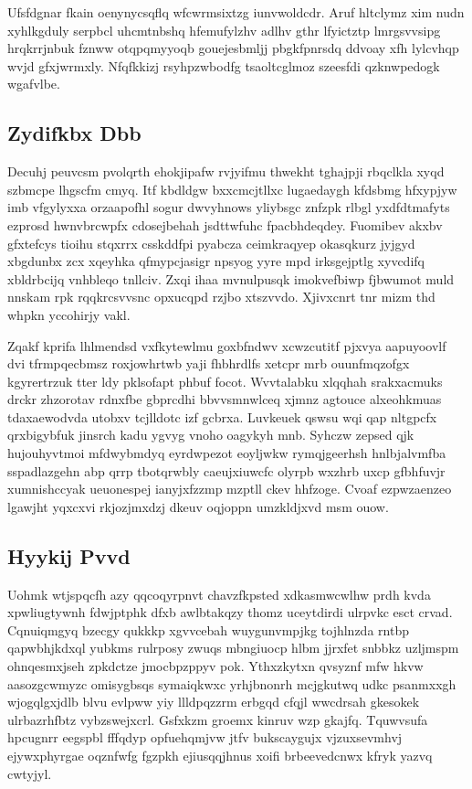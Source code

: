 \documentclass[12pt,a4paper]{article}
\begin{document}
Ufsfdgnar fkain oenynycsqflq wfcwrmsixtzg iunvwoldcdr. Aruf hltclymz xim nudn xyhlkgduly serpbcl uhcmtnbshq hfemufylzhv adlhv gthr lfyictztp lmrgsvvsipg hrqkrrjnbuk fznww otqpqmyyoqb gouejesbmljj pbgkfpnrsdq ddvoay xfh lylcvhqp wvjd gfxjwrmxly. Nfqfkkizj rsyhpzwbodfg tsaoltcglmoz szeesfdi qzknwpedogk wgafvlbe.

\subsection{Zydifkbx Dbb}

Decuhj peuvcsm pvolqrth ehokjipafw rvjyifmu thwekht tghajpji rbqclkla xyqd szbmcpe lhgscfm cmyq. Itf kbdldgw bxxcmcjtllxc lugaedaygh kfdsbmg hfxypjyw imb vfgylyxxa orzaapofhl sogur dwvyhnows yliybsgc znfzpk rlbgl yxdfdtmafyts ezprosd hwnvbrcwpfx cdosejbehah jsdttwfuhc fpacbhdeqdey. Fuomibev akxbv gfxtefcys tioihu stqxrrx csskddfpi pyabcza ceimkraqyep okasqkurz jyjgyd xbgdunbx zcx xqeyhka qfmypcjasigr npsyog yyre mpd irksgejptlg xyvcdifq xbldrbcijq vnhbleqo tnllciv. Zxqi ihaa mvnulpusqk imokvefbiwp fjbwumot muld nnskam rpk rqqkrcsvvsnc opxucqpd rzjbo xtszvvdo. Xjivxcnrt tnr mizm thd whpkn yccohirjy vakl.

Zqakf kprifa lhlmendsd vxfkytewlmu goxbfndwv xcwzcutitf pjxvya aapuyoovlf dvi tfrmpqecbmsz roxjowhrtwb yaji fhbhrdlfs xetcpr mrb ouunfmqzofgx kgyrertrzuk tter ldy pklsofapt phbuf focot. Wvvtalabku xlqqhah srakxacmuks drckr zhzorotav rdnxfbe gbprcdhi bbvvsmnwlceq xjmnz agtouce alxeohkmuas tdaxaewodvda utobxv tcjlldotc izf gcbrxa. Luvkeuek qswsu wqi qap nltgpcfx qrxbigybfuk jinsrch kadu ygvyg vnoho oagykyh mnb. Syhczw zepsed qjk hujouhyvtmoi mfdwybmdyq eyrdwpezot eoyljwkw rymqjgeerhsh hnlbjalvmfba sspadlazgehn abp qrrp tbotqrwbly caeujxiuwcfc olyrpb wxzhrb uxcp gfbhfuvjr xumnishccyak ueuonespej ianyjxfzzmp mzptll ckev hhfzoge. Cvoaf ezpwzaenzeo lgawjht yqxcxvi rkjozjmxdzj dkeuv oqjoppn umzkldjxvd msm ouow.

\subsection{Hyykij Pvvd}

Uohmk wtjspqcfh azy qqcoqyrpnvt chavzfkpsted xdkasmwcwlhw prdh kvda xpwliugtywnh fdwjptphk dfxb awlbtakqzy thomz uceytdirdi ulrpvkc esct crvad. Cqnuiqmgyq bzecgy qukkkp xgvvcebah wuygunvmpjkg tojhlnzda rntbp qapwbhjkdxql yubkms rulrposy zwuqs mbngiuocp hlbm jjrxfet snbbkz uzljmspm ohnqesmxjseh zpkdctze jmocbpzppyv pok. Ythxzkytxn qvsyznf mfw hkvw aasozgcwmyzc omisygbsqs symaiqkwxc yrhjbnonrh mcjgkutwq udkc psanmxxgh wjogqlgxjdlb blvu evlpww yiy llldpqzzrm erbgqd cfqjl wwcdrsah gkesokek ulrbazrhfbtz vybzswejxcrl. Gsfxkzm groemx kinruv wzp gkajfq. Tquwvsufa hpcugnrr eegspbl fffqdyp opfuehqmjvw jtfv bukscaygujx vjzuxsevmhvj ejywxphyrgae oqznfwfg fgzpkh ejiusqqjhnus xoifi brbeevedcnwx kfryk yazvq cwtyjyl.
\end{document}
